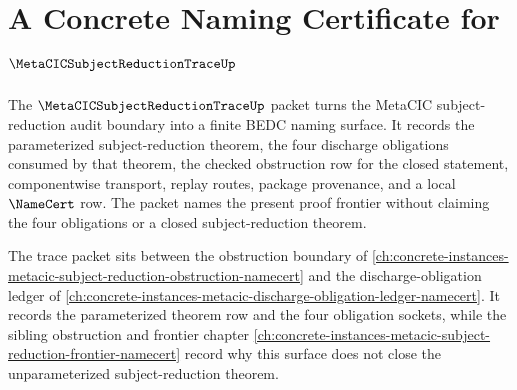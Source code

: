 \chapter{A Concrete Naming Certificate for $\MetaCICSubjectReductionTraceUp$}
\label{ch:concrete-instances-metacic-subject-reduction-trace-namecert}

The $\MetaCICSubjectReductionTraceUp$ packet turns the MetaCIC subject-reduction audit boundary into a finite BEDC naming surface. It records the parameterized subject-reduction theorem, the four discharge obligations consumed by that theorem, the checked obstruction row for the closed statement, componentwise transport, replay routes, package provenance, and a local $\NameCert$ row. The packet names the present proof frontier without claiming the four obligations or a closed subject-reduction theorem.

The trace packet sits between the obstruction boundary of \autoref{ch:concrete-instances-metacic-subject-reduction-obstruction-namecert} and the discharge-obligation ledger of \autoref{ch:concrete-instances-metacic-discharge-obligation-ledger-namecert}. It records the parameterized theorem row and the four obligation sockets, while the sibling obstruction and frontier chapter \autoref{ch:concrete-instances-metacic-subject-reduction-frontier-namecert} record why this surface does not close the unparameterized subject-reduction theorem.

